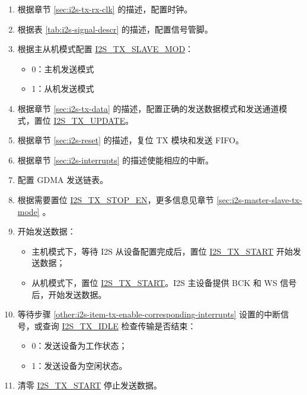 \documentclass[main\_\_CN.tex]{subfiles}
\begin{document}
\begin{enumerate}
    \item 根据章节 \ref{sec:i2s-tx-rx-clk} \textit{} 的描述，配置时钟。
    \item 根据表 \ref{tab:i2s-signal-descr} \textit{} 的描述，配置信号管脚。
    \item 根据主从机模式配置 \hyperref[fielddesc:I2STXSLAVEMOD]{I2S\_TX\_SLAVE\_MOD}：
    \begin{itemize}
        \item 0：主机发送模式
        \item 1：从机发送模式
    \end{itemize}
    \item 根据章节 \ref{sec:i2s-tx-data} \textit{} 的描述，配置正确的发送数据模式和发送通道模式，置位 \hyperref[fielddesc:I2STXUPDATE]{I2S\_TX\_UPDATE}。
    \item 根据章节 \ref{sec:i2s-reset} \textit{} 的描述，复位 TX 模块和发送 FIFO。
    \item 根据章节 \ref{sec:i2s-interrupts} \textit{} 的描述使能相应的中断。\label{other:i2s-item-tx-enable-corresponding-interrupts}
    \item 配置 GDMA 发送链表。 
    \item 根据需要置位 \hyperref[fielddesc:I2STXSTOPEN]{I2S\_TX\_STOP\_EN}，更多信息见章节 \ref{sec:i2s-master-slave-tx-mode} \textit{}。
    \item 开始发送数据：
    \begin{itemize}
        \item 主机模式下，等待 I2S 从设备配置完成后，置位 \hyperref[fielddesc:I2STXSTART]{I2S\_TX\_START} 开始发送数据；
        \item 从机模式下，置位 \hyperref[fielddesc:I2STXSTART]{I2S\_TX\_START}。I2S 主设备提供 BCK 和 WS 信号后，开始发送数据。
    \end{itemize}
    \item 等待步骤 \ref{other:i2s-item-tx-enable-corresponding-interrupts} 设置的中断信号，或查询 \hyperref[fielddesc:I2STXIDLE]{I2S\_TX\_IDLE} 检查传输是否结束：
    \begin{itemize}
        \item 0：发送设备为工作状态；
        \item 1：发送设备为空闲状态。
    \end{itemize}
    \item 清零 \hyperref[fielddesc:I2STXSTART]{I2S\_TX\_START} 停止发送数据。
\end{enumerate}
\end{document}
